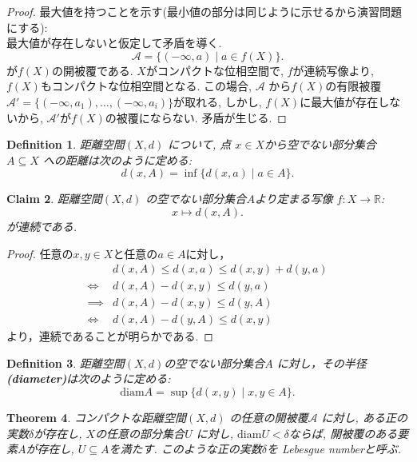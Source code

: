 \documentclass[dvipdfmx]{jbook}
\newtheorem{theorem}{Theorem}[section]
\newtheorem{definition}[theorem]{Definition}
\newtheorem{claim}[theorem]{Claim}
\theoremstyle{remark}
\theoremstyle{plain}
\begin{document}
\begin{proof}
	最大値を持つことを示す(最小値の部分は同じように示せるから演習問題にする):\\
	最大値が存在しないと仮定して矛盾を導く. 
	\[
	\mathcal{A} = \{ (- \infty ,a )  \mid  a \in f(X)\} 
	.\] 
	が$f(X)$の開被覆である.  $X$がコンパクトな位相空間で,  $f$が連続写像より,  $f(X)$もコンパクトな位相空間となる.
	この場合,  $\mathcal{A}$ から$f(X)$の有限被覆$\mathcal{A}' = \{ (-\infty, a_1) , \ldots ,(-\infty,a_i)\} $が取れる, しかし,  $f(X)$に最大値が存在しないから,  $\mathcal{A}'$が$f(X)$の被覆にならない. 矛盾が生じる.

\end{proof}

\begin{definition}
	距離空間$\left( X ,d \right) $ について, 点 $x \in  X$から空でない部分集合 $  A \subseteq X$ への距離は次のように定める:
	\[
	d\left( x,A \right) = \inf  \{d\left( x,a \right)  \mid a \in A\} 
	.\] 
\end{definition}

\begin{claim}
	距離空間$\left( X ,d \right) $ の空でない部分集合$A$より定まる写像 $f: X \to \mathbb{R}$:
	\[
	x \mapsto d(x,A)
	.\] 
が連続である.
\end{claim}

\begin{proof}
	任意の$x,y \in X$と任意の$a \in A$に対し，
	\[
	\begin{aligned}
		& d\left( x,A \right)   \le d(x,a) \le d(x,y) + d(y,a)\\
		\iff &d(x,A) - d(x,y)  \le d(y,a) \\
		\implies &d(x,A) -d(x,y) \le d(y,A)\\
		\iff & d(x,A) -d(y,A) \le d(x,y)
	\end{aligned}
	\] 
	より，連続であることが明らかである.
\end{proof}

\begin{definition}
	距離空間$\left( X ,d \right) $の空でない部分集合$A$ に対し，その半径\textbf{(diameter)}は次のように定める:
	\[
		\mathrm{diam}A= \sup \{d(x,y)  \mid x,y \in A\} 
	.\] 
\end{definition}

\begin{theorem}
	コンパクトな距離空間$\left( X,d \right) $ の任意の開被覆$\mathcal{A}$ に対し, 
	ある正の実数$\delta$が存在し, $X$の任意の部分集合$U$ に対し, $\mathrm{diam}U < \delta$ならば, 開被覆のある要素$A$が存在し, $U \subseteq A$を満たす.
	このような正の実数$\delta$を Lebesgue numberと呼ぶ.
\end{theorem}
\end{document}
